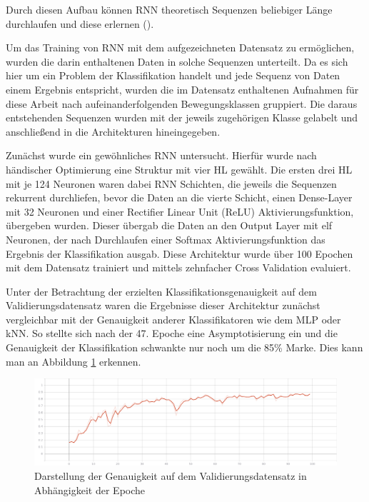 Durch diesen Aufbau können RNN theoretisch Sequenzen beliebiger Länge durchlaufen und diese erlernen (\cite{pascanu2013difficulty}). 


Um das Training von RNN mit dem aufgezeichneten Datensatz zu ermöglichen, wurden die darin enthaltenen Daten in solche Sequenzen unterteilt. Da es sich hier um ein Problem der Klassifikation handelt und jede Sequenz von Daten einem Ergebnis entspricht, wurden die im Datensatz enthaltenen Aufnahmen für diese Arbeit nach aufeinanderfolgenden Bewegungsklassen gruppiert. Die daraus entstehenden Sequenzen wurden mit der jeweils zugehörigen Klasse gelabelt und anschließend in die Architekturen hineingegeben.

Zunächst wurde ein gewöhnliches RNN untersucht. Hierfür wurde nach händischer Optimierung eine Struktur mit vier HL gewählt. Die ersten drei HL mit je 124 Neuronen waren dabei RNN Schichten, die jeweils die Sequenzen rekurrent durchliefen, bevor die Daten an die vierte Schicht, einen Dense-Layer mit 32 Neuronen und einer Rectifier Linear Unit (ReLU) Aktivierungsfunktion, übergeben wurden. Dieser übergab die Daten an den Output Layer mit elf Neuronen, der nach Durchlaufen einer Softmax Aktivierungsfunktion das Ergebnis der Klassifikation ausgab. Diese Architektur wurde über 100 Epochen mit dem Datensatz trainiert und mittels zehnfacher Cross Validation evaluiert.

Unter der Betrachtung der erzielten Klassifikationsgenauigkeit auf dem Validierungsdatensatz waren die Ergebnisse dieser Architektur zunächst vergleichbar mit der Genauigkeit anderer Klassifikatoren wie dem MLP oder kNN.
So stellte sich nach der 47. Epoche eine Asymptotisierung ein und die Genauigkeit der Klassifikation schwankte nur noch um die 85\% Marke. Dies kann man an Abbildung \ref{srnn-1-acc} erkennen.

\begin{figure}[h]
    \begin{center}
        \includegraphics[scale=0.3]{grafiken/srnn-1-acc.png}
        \caption{Darstellung der Genauigkeit auf dem Validierungsdatensatz in Abhängigkeit der Epoche}
        \label{srnn-1-acc}
    \end{center}
\end{figure}

